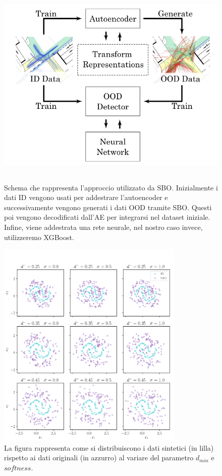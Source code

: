 \begin{figure}[htpb]
    \centering
    \includegraphics[width=\textwidth,height=10cm,keepaspectratio=true]{img/sbo_schema.png}
    \caption{
        Schema che rappresenta l'approccio utilizzato da SBO. Inizialmente i dati ID vengono usati per addestrare l'autoencoder e successivamente vengono generati i dati OOD tramite SBO. Questi poi vengono decodificati dall'AE per integrarsi nel dataset iniziale. Infine, viene addestrata una rete neurale, nel nostro caso invece, utilizzeremo XGBoost.
    }
    \label{fig:sbo_schema}
\end{figure}

\begin{figure}[htpb]
    \centering
    \includegraphics[width=\textwidth,height=10cm,keepaspectratio=true]{img/sbo_dmin.png}
    \caption{
      La figura rappresenta come si distribuiscono i dati sintetici (in lilla) rispetto ai dati originali (in azzurro) al variare del parametro $d_{min}$ e $softness$.
    }
    \label{fig:sbo_dmin}
\end{figure}


